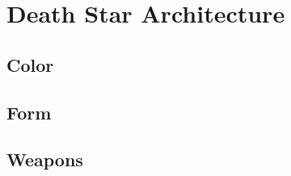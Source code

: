 \chapter{Death Star Architecture}\label{chp:architecture}
\section{Color}\label{chp:architecture:color}
\section{Form}\label{chp:architecture:form}
\section{Weapons}\label{chp:architecture:weapons}
